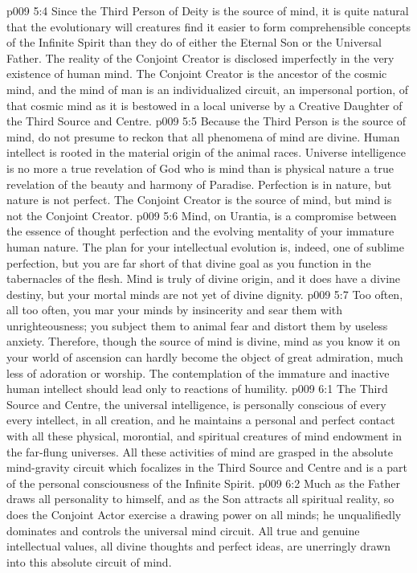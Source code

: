\vs p009 5:4 \pc Since the Third Person of Deity is the source of mind, it is quite natural that the evolutionary will creatures find it easier to form comprehensible concepts of the Infinite Spirit than they do of either the Eternal Son or the Universal Father. The reality of the Conjoint Creator is disclosed imperfectly in the very existence of human mind. The Conjoint Creator is the ancestor of the cosmic mind, and the mind of man is an individualized circuit, an impersonal portion, of that cosmic mind as it is bestowed in a local universe by a Creative Daughter of the Third Source and Centre.
\vs p009 5:5 \pc Because the Third Person is the source of mind, do not presume to reckon that all phenomena of mind are divine. Human intellect is rooted in the material origin of the animal races. Universe intelligence is no more a true revelation of God who is mind than is physical nature a true revelation of the beauty and harmony of Paradise. Perfection is in nature, but nature is not perfect. The Conjoint Creator is the source of mind, but mind is not the Conjoint Creator.
\vs p009 5:6 Mind, on Urantia, is a compromise between the essence of thought perfection and the evolving mentality of your immature human nature. The plan for your intellectual evolution is, indeed, one of sublime perfection, but you are far short of that divine goal as you function in the tabernacles of the flesh. Mind is truly of divine origin, and it does have a divine destiny, but your mortal minds are not yet of divine dignity.
\vs p009 5:7 Too often, all too often, you mar your minds by insincerity and sear them with unrighteousness; you subject them to animal fear and distort them by useless anxiety. Therefore, though the source of mind is divine, mind as you know it on your world of ascension can hardly become the object of great admiration, much less of adoration or worship. The contemplation of the immature and inactive human intellect should lead only to reactions of humility.
\vs p009 6:1 The Third Source and Centre, the universal intelligence, is personally conscious of every  every intellect, in all creation, and he maintains a personal and perfect contact with all these physical, morontial, and spiritual creatures of mind endowment in the far\hyp{}flung universes. All these activities of mind are grasped in the absolute mind\hyp{}gravity circuit which focalizes in the Third Source and Centre and is a part of the personal consciousness of the Infinite Spirit.
\vs p009 6:2 Much as the Father draws all personality to himself, and as the Son attracts all spiritual reality, so does the Conjoint Actor exercise a drawing power on all minds; he unqualifiedly dominates and controls the universal mind circuit. All true and genuine intellectual values, all divine thoughts and perfect ideas, are unerringly drawn into this absolute circuit of mind.
